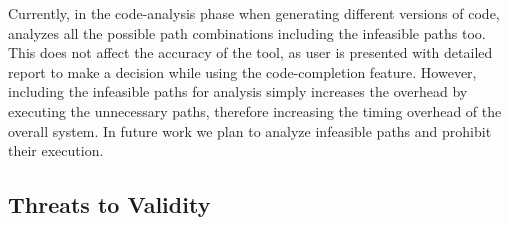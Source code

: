 			
	Currently, in the code-analysis phase when generating different versions of code, \dompletion analyzes all the possible path combinations including the infeasible paths too. This does not affect the accuracy of the tool, as user is presented with detailed report to make a decision while using the code-completion feature. However, including the infeasible paths for analysis simply increases the overhead by executing the unnecessary paths, therefore increasing the timing overhead of the overall system. In future work we plan to analyze infeasible paths and prohibit their execution.
	
	
	
	
	\subsection{Threats to Validity}
	\label{Sec:Threats}
